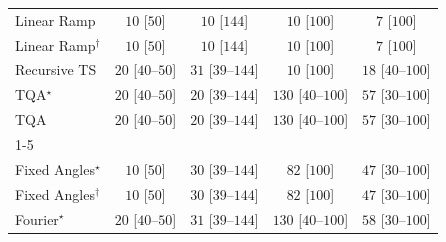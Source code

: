\begin{tabular}{l|cccc|}
Linear Ramp & {\cellcolor[HTML]{F7FCF5}} \color[HTML]{000000} $10$ [$50$] & {\cellcolor[HTML]{F7FCF5}} \color[HTML]{000000} $10$ [$144$] & {\cellcolor[HTML]{F7FCF5}} \color[HTML]{000000} $10$ [$100$] & {\cellcolor[HTML]{F7FCF5}} \color[HTML]{000000} $7$ [$100$] \\
Linear Ramp$^\dagger$ & {\cellcolor[HTML]{F7FCF5}} \color[HTML]{000000} $10$ [$50$] & {\cellcolor[HTML]{F7FCF5}} \color[HTML]{000000} $10$ [$144$] & {\cellcolor[HTML]{F7FCF5}} \color[HTML]{000000} $10$ [$100$] & {\cellcolor[HTML]{F7FCF5}} \color[HTML]{000000} $7$ [$100$] \\
Recursive TS & {\cellcolor[HTML]{F5FBF2}} \color[HTML]{000000} $20$ [$40$--$50$] & {\cellcolor[HTML]{F3FAF0}} \color[HTML]{000000} $31$ [$39$--$144$] & {\cellcolor[HTML]{F7FCF5}} \color[HTML]{000000} $10$ [$100$] & {\cellcolor[HTML]{F5FBF3}} \color[HTML]{000000} $18$ [$40$--$100$] \\
TQA$^\star$ & {\cellcolor[HTML]{F5FBF2}} \color[HTML]{000000} $20$ [$40$--$50$] & {\cellcolor[HTML]{F5FBF2}} \color[HTML]{000000} $20$ [$39$--$144$] & {\cellcolor[HTML]{DFF3DA}} \color[HTML]{000000} $130$ [$40$--$100$] & {\cellcolor[HTML]{EFF9EB}} \color[HTML]{000000} $57$ [$30$--$100$] \\
TQA & {\cellcolor[HTML]{F5FBF2}} \color[HTML]{000000} $20$ [$40$--$50$] & {\cellcolor[HTML]{F5FBF2}} \color[HTML]{000000} $20$ [$39$--$144$] & {\cellcolor[HTML]{DFF3DA}} \color[HTML]{000000} $130$ [$40$--$100$] & {\cellcolor[HTML]{EFF9EB}} \color[HTML]{000000} $57$ [$30$--$100$] \\
\cline{1-5}
\multicolumn{5}{c}{\rule{0pt}{8pt}PP} \\
\midrule
Fixed Angles$^\star$ & {\cellcolor[HTML]{F7FCF5}} \color[HTML]{000000} $10$ [$50$] & {\cellcolor[HTML]{F3FAF0}} \color[HTML]{000000} $30$ [$39$--$144$] & {\cellcolor[HTML]{EAF7E6}} \color[HTML]{000000} $82$ [$100$] & {\cellcolor[HTML]{F0F9ED}} \color[HTML]{000000} $47$ [$30$--$100$] \\
Fixed Angles$^\dagger$ & {\cellcolor[HTML]{F7FCF5}} \color[HTML]{000000} $10$ [$50$] & {\cellcolor[HTML]{F3FAF0}} \color[HTML]{000000} $30$ [$39$--$144$] & {\cellcolor[HTML]{EAF7E6}} \color[HTML]{000000} $82$ [$100$] & {\cellcolor[HTML]{F0F9ED}} \color[HTML]{000000} $47$ [$30$--$100$] \\
Fourier$^\star$ & {\cellcolor[HTML]{F5FBF2}} \color[HTML]{000000} $20$ [$40$--$50$] & {\cellcolor[HTML]{F3FAF0}} \color[HTML]{000000} $31$ [$39$--$144$] & {\cellcolor[HTML]{DFF3DA}} \color[HTML]{000000} $130$ [$40$--$100$] & {\cellcolor[HTML]{EFF9EB}} \color[HTML]{000000} $58$ [$30$--$100$] \\

\end{tabular}
